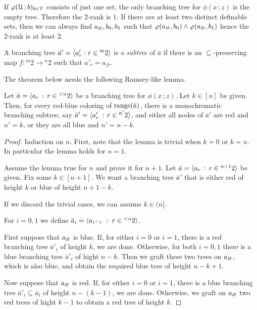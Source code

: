 \documentclass[scombinatorics.tex]{subfiles}
\begin{document}
\begin{example}
  If $\varphi(\EuScript U\,;b)_{b\in\EuScript V}$ consists of just one set, the only branching tree for $\phi(x\,;z)$ is the empty tree.
  Therefore the 2-rank is $1$.
  If there are at least two distinct definable sets, then we can always find $a_\varnothing, b_0,b_1$ such that $\varphi(a_\varnothing,b_0)\wedge\varphi(a_\varnothing,b_1)$ hence the 2-rank is at least $2$.\QED  
\end{example}

A branching tree $\bar a'=\langle a'_r:r\in{}^m2\rangle$ is a \emph{subtree\/} of $\bar a$ if there is an $\subseteq$-preserving map $f:{}^m2\to{}^n2$ such that $a'_r=a_{fr}$.

The theorem below needs the following Ramsey-like lemma.



\begin{lemma}\label{lem_Reamsey_tree}
  Let $\bar a=\langle a_r\, :\, r\in{}^{<n}2\rangle$ be a branching tree for $\phi(x\,;z)$.
  Let $k\in[n]$ be given.
  Then, for every red-blue coloring of $\mathop{\rm range}(\bar a)$,  there is a monochromatic branching subtree, say $\bar a'=\langle a'_r\, :\, r\in{}^{n'}2\rangle$, and either all nodes of $\bar a'$ are red and $n'=k$, or they are all blue and $n'=n-k$.
\end{lemma}

\begin{proof}
  Induction on $n$.
  First, note that the lemma is trivial when $k=0$ or $k=n$.
  In particular the lemma holds for $n=1$.

  Assume the lemma true for $n$ and prove it for $n+1$.
  Let  $\bar a=\langle a_r\, :\, r\in{}^{n+1}2\rangle$ be given.
  Fix some $k\in[n+1]$. 
  We want a branching tree $\bar a'$ that is either red of height $k$ or blue of height $n+1-k$.
  
  If we discard the trivial cases, we can assume $k\in(n]$.

  For $i=0,1$ we define $\bar a_i=\langle a_{i^\frown r}\;:\;r\in {}^{<n}2\rangle$.

  First suppose that $a_\varnothing$ is blue.
  If, for either $i=0$ or $i=1$, there is a red branching tree $\bar a'_i$ of height $k$, we are done.
  Otherwise, for both $i=0,1$ there is a blue branching tree $\bar a'_i$ of hight $n-k$.
  Then we graft these two trees on $a_\varnothing$, which is also blue, and obtain the required blue tree of height $n-k+1$.
  
  Now suppose that $a_\varnothing$ is red.
  If, for either $i=0$ or $i=1$, there is a blue branching tree $\bar a'_i\subseteq \bar a_i$ of height $n-(k-1)$, we are done.
  Otherwise, we graft on $a_\varnothing$ two red trees of hight $k-1$ to obtain a red tree of height $k$.  
\end{proof}
\end{document}
